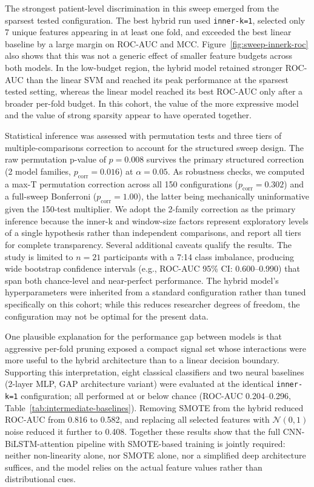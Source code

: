 The strongest patient-level discrimination in this sweep emerged from the sparsest tested configuration. The best hybrid run used \texttt{inner-k=1}, selected only 7 unique features appearing in at least one fold, and exceeded the best linear baseline by a large margin on ROC-AUC and MCC. Figure~\ref{fig:sweep-innerk-roc} also shows that this was not a generic effect of smaller feature budgets across both models. In the low-budget region, the hybrid model retained stronger ROC-AUC than the linear SVM and reached its peak performance at the sparsest tested setting, whereas the linear model reached its best ROC-AUC only after a broader per-fold budget. In this cohort, the value of the more expressive model and the value of strong sparsity appear to have operated together.

Statistical inference was assessed with permutation tests and three tiers of multiple-comparisons correction to account for the structured sweep design. The raw permutation p-value of $p=0.008$ survives the primary structured correction (2 model families, $p_\text{corr}=0.016$) at $\alpha=0.05$. As robustness checks, we computed a max-T permutation correction across all 150 configurations ($p_\text{corr}=0.302$) and a full-sweep Bonferroni ($p_\text{corr}=1.00$), the latter being mechanically uninformative given the 150-test multiplier. We adopt the 2-family correction as the primary inference because the inner-k and window-size factors represent exploratory levels of a single hypothesis rather than independent comparisons, and report all tiers for complete transparency. Several additional caveats qualify the results. The study is limited to $n=21$ participants with a 7:14 class imbalance, producing wide bootstrap confidence intervals (e.g., ROC-AUC 95\% CI: 0.600--0.990) that span both chance-level and near-perfect performance. The hybrid model's hyperparameters were inherited from a standard configuration rather than tuned specifically on this cohort; while this reduces researcher degrees of freedom, the configuration may not be optimal for the present data.

One plausible explanation for the performance gap between models is that aggressive per-fold pruning exposed a compact signal set whose interactions were more useful to the hybrid architecture than to a linear decision boundary. Supporting this interpretation, eight classical classifiers and two neural baselines (2-layer MLP, GAP architecture variant) were evaluated at the identical \texttt{inner-k=1} configuration; all performed at or below chance (ROC-AUC 0.204--0.296, Table~\ref{tab:intermediate-baselines}). Removing SMOTE from the hybrid reduced ROC-AUC from 0.816 to 0.582, and replacing all selected features with $\mathcal{N}(0,1)$ noise reduced it further to 0.408. Together these results show that the full CNN-BiLSTM-attention pipeline with SMOTE-based training is jointly required: neither non-linearity alone, nor SMOTE alone, nor a simplified deep architecture suffices, and the model relies on the actual feature values rather than distributional cues.

